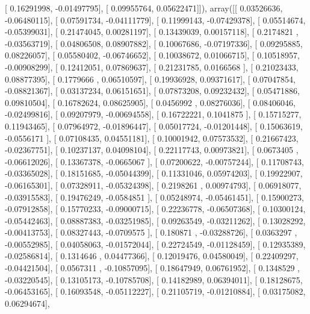 \documentclass{article}
\begin{document}
       [ 0.16291998, -0.01497795],
       [ 0.09955764,  0.05622471]]), array([[ 0.03526636, -0.06480115],
       [ 0.07591734, -0.04111779],
       [ 0.11999143, -0.07429378],
       [ 0.05514674, -0.05399031],
       [ 0.21474045,  0.00281197],
       [ 0.13439039,  0.00157118],
       [ 0.2174821 , -0.03563719],
       [ 0.04806508,  0.08907882],
       [ 0.10067686, -0.07197336],
       [ 0.09295885,  0.08226057],
       [ 0.05580402, -0.06746652],
       [ 0.10038672,  0.01066715],
       [ 0.10518957, -0.00908299],
       [ 0.12412051,  0.07869637],
       [ 0.21231785,  0.0166568 ],
       [ 0.21023433,  0.08877395],
       [ 0.1779666 ,  0.06510597],
       [ 0.19936928,  0.09371617],
       [ 0.07047854, -0.08821367],
       [ 0.03137234,  0.06151651],
       [ 0.07873208,  0.09232432],
       [ 0.05471886,  0.09810504],
       [ 0.16782624,  0.08625905],
       [ 0.0456992 ,  0.08276036],
       [ 0.08406046, -0.02499816],
       [ 0.09207979, -0.00694558],
       [ 0.16722221,  0.1041875 ],
       [ 0.15715277,  0.11943465],
       [ 0.07964972, -0.01896447],
       [ 0.05017724, -0.01201448],
       [ 0.15063619, -0.0556171 ],
       [ 0.07108435,  0.04551181],
       [ 0.10001942,  0.07573532],
       [ 0.21667423, -0.02367751],
       [ 0.10237137,  0.04098104],
       [ 0.22117743,  0.00973821],
       [ 0.0673405 , -0.06612026],
       [ 0.13367378, -0.0665067 ],
       [ 0.07200622, -0.00757244],
       [ 0.11708743, -0.03365028],
       [ 0.18151685, -0.05044399],
       [ 0.11331046,  0.05974203],
       [ 0.19922907, -0.06165301],
       [ 0.07328911, -0.05324398],
       [ 0.2198261 ,  0.00974793],
       [ 0.06918077, -0.03915583],
       [ 0.19476249, -0.0584851 ],
       [ 0.05248974, -0.05461451],
       [ 0.15900273, -0.07912858],
       [ 0.15770233, -0.09000715],
       [ 0.22236778, -0.06507368],
       [ 0.10300124, -0.05442463],
       [ 0.08887383, -0.03251985],
       [ 0.09263549, -0.03211262],
       [ 0.13028292, -0.00413753],
       [ 0.08327443, -0.0709575 ],
       [ 0.180871  , -0.03288726],
       [ 0.0363297 , -0.00552985],
       [ 0.04058063, -0.01572044],
       [ 0.22724549, -0.01128459],
       [ 0.12935389, -0.02586814],
       [ 0.1314646 ,  0.04477366],
       [ 0.12019476,  0.04580049],
       [ 0.22409297, -0.04421504],
       [ 0.0567311 , -0.10857095],
       [ 0.18647949,  0.06761952],
       [ 0.1348529 , -0.03220545],
       [ 0.13105173, -0.10785708],
       [ 0.14182989,  0.06394011],
       [ 0.18128675, -0.06453165],
       [ 0.16093548, -0.05112227],
       [ 0.21105719, -0.01210884],
       [ 0.03175082,  0.06294674],
\end{document}
